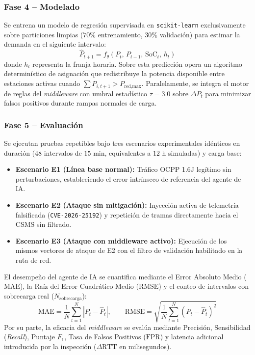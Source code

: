 \documentclass[conference]{IEEEtran}
\begin{document}
\subsubsection{Fase 4 -- Modelado}
Se entrena un modelo de regresión supervisada en \texttt{scikit-learn} exclusivamente sobre particiones limpias ($70\%$ entrenamiento, $30\%$ validación) para estimar la demanda en el siguiente intervalo:
\begin{equation}
\hat{P}_{t+1} = f_{\theta}(P_t,\, P_{t-1},\, \text{SoC}_t,\, h_t)
\end{equation}
donde $h_t$ representa la franja horaria. Sobre esta predicción opera un algoritmo determinístico de asignación que redistribuye la potencia disponible entre estaciones activas cuando $\sum \hat{P}_{i,t+1} > P_{\text{red,max}}$. Paralelamente, se integra el motor de reglas del \textit{middleware} con umbral estadístico $\tau = 3.0$ sobre $\Delta P_t$ para minimizar falsos positivos durante rampas normales de carga.

\subsubsection{Fase 5 -- Evaluación}
Se ejecutan pruebas repetibles bajo tres escenarios experimentales idénticos en duración ($48$ intervalos de $15\text{ min}$, equivalentes a $12\text{ h}$ simuladas) y carga base:
\begin{itemize}
    \item \textbf{Escenario E1 (Línea base normal):} Tráfico OCPP 1.6J legítimo sin perturbaciones, estableciendo el error intrínseco de referencia del agente de IA.
    \item \textbf{Escenario E2 (Ataque sin mitigación):} Inyección activa de telemetría falsificada (\texttt{CVE-2026-25192}) y repetición de tramas directamente hacia el CSMS sin filtrado.
    \item \textbf{Escenario E3 (Ataque con middleware activo):} Ejecución de los mismos vectores de ataque de E2 con el filtro de validación habilitado en la ruta de red.
\end{itemize}

El desempeño del agente de IA se cuantifica mediante el Error Absoluto Medio ($\text{MAE}$), la Raíz del Error Cuadrático Medio ($\text{RMSE}$) y el conteo de intervalos con sobrecarga real ($N_{\text{sobrecarga}}$):
\begin{equation}
\text{MAE} = \frac{1}{N}\sum_{t=1}^{N} |P_t - \hat{P}_t|, \qquad \text{RMSE} = \sqrt{\frac{1}{N}\sum_{t=1}^{N} (P_t - \hat{P}_t)^2}
\end{equation}
Por su parte, la eficacia del \textit{middleware} se evalúa mediante Precisión, Sensibilidad (\textit{Recall}), Puntaje $F_1$, Tasa de Falsos Positivos ($\text{FPR}$) y latencia adicional introducida por la inspección ($\Delta \text{RTT}$ en milisegundos).
\end{document}

